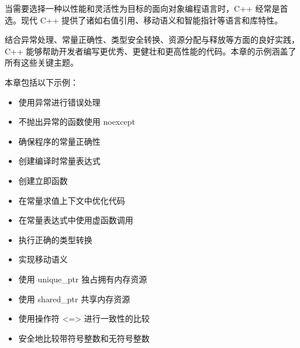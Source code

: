 当需要选择一种以性能和灵活性为目标的面向对象编程语言时，C++ 经常是首选。现代 C++ 提供了诸如右值引用、移动语义和智能指针等语言和库特性。

结合异常处理、常量正确性、类型安全转换、资源分配与释放等方面的良好实践，C++ 能够帮助开发者编写更优秀、更健壮和更高性能的代码。本章的示例涵盖了所有这些关键主题。

本章包括以下示例：

\begin{itemize}
\item
使用异常进行错误处理

\item
不抛出异常的函数使用 noexcept

\item
确保程序的常量正确性

\item
创建编译时常量表达式

\item
创建立即函数

\item
在常量求值上下文中优化代码

\item
在常量表达式中使用虚函数调用

\item
执行正确的类型转换

\item
实现移动语义

\item
使用 unique\_ptr 独占拥有内存资源

\item
使用 shared\_ptr 共享内存资源

\item
使用操作符 <=> 进行一致性的比较

\item
安全地比较带符号整数和无符号整数
\end{itemize}

